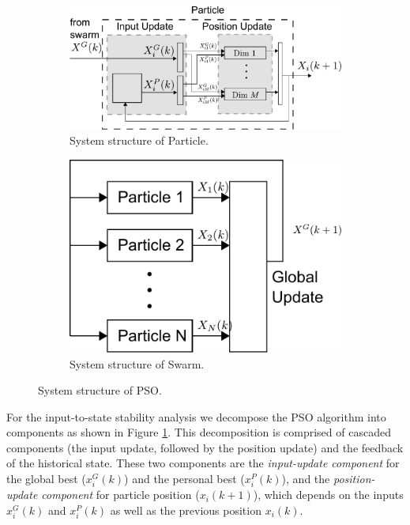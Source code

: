 \documentclass[phd]{byuprop}
\begin{document}
\begin{appendices}
\begin{figure}[htbp]
	\centering
	\begin{subfigure}[t]{0.6\linewidth}
		\centering
		\includegraphics[width=\textwidth]{fig/particle_sys_flow.pdf}
		\caption{System structure of Particle.}
		\label{fig:sys:particle}
	\end{subfigure}  
	\begin{subfigure}[t]{0.37\linewidth}
		\centering
		\includegraphics[width=\textwidth]{fig/pso_sys_flow.pdf}
		\caption{System structure of Swarm.}
		\label{fig:sys:swarm}
	\end{subfigure}   
	\caption{System structure of PSO.}
	\label{fig:sys:pso}
\end{figure}

For the input-to-state stability analysis we decompose the PSO algorithm into components as shown in Figure \ref{fig:sys:particle}. 
This decomposition is comprised of cascaded components (the input update, followed by the position update) and the feedback of the historical state.
These two components are the 
\emph{input-update component} for the global best ($ x^{G}_{i}(k) $) and the personal best ($ x^{P}_{i}(k) $), and the 
\emph{position-update component} for particle position ($ x_{i}(k+1) $), which depends on the inputs $ x^{G}_{i}(k) $ and $ x^{P}_{i}(k) $ as well as the previous position $ x_{i}(k) $.


\end{appendices}
\end{document}
